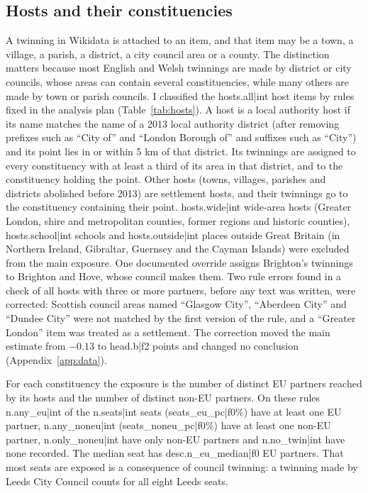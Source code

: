 \documentclass[11pt,a4paper]{article}
\begin{document}
\subsection{Hosts and their constituencies}
A twinning in Wikidata is attached to an item, and that item may be a town, a village, a parish, a district, a city council area or a county. The distinction matters because most English and Welsh twinnings are made by district or city councils, whose areas can contain several constituencies, while many others are made by town or parish councils. I classified the {{hosts.all|int}} host items by rules fixed in the analysis plan (Table~\ref{tab:hosts}). A host is a local authority host if its name matches the name of a 2013 local authority district (after removing prefixes such as ``City of'' and ``London Borough of'' and suffixes such as ``City'') and its point lies in or within 5 km of that district. Its twinnings are assigned to every constituency with at least a third of its area in that district, and to the constituency holding the point. Other hosts (towns, villages, parishes and districts abolished before 2013) are settlement hosts, and their twinnings go to the constituency containing their point. {{hosts.wide|int}} wide-area hosts (Greater London, shire and metropolitan counties, former regions and historic counties), {{hosts.school|int}} schools and {{hosts.outside|int}} places outside Great Britain (in Northern Ireland, Gibraltar, Guernsey and the Cayman Islands) were excluded from the main exposure. One documented override assigns Brighton's twinnings to Brighton and Hove, whose council makes them. Two rule errors found in a check of all hosts with three or more partners, before any text was written, were corrected: Scottish council areas named ``Glasgow City'', ``Aberdeen City'' and ``Dundee City'' were not matched by the first version of the rule, and a ``Greater London'' item was treated as a settlement. The correction moved the main estimate from $-0.13$ to {{head.b|f2}} points and changed no conclusion (Appendix~\ref{app:data}).

For each constituency the exposure is the number of distinct EU partners reached by its hosts and the number of distinct non-EU partners. On these rules {{n.any_eu|int}} of the {{n.seats|int}} seats ({{seats_eu_pc|f0}}\%) have at least one EU partner, {{n.any_noneu|int}} ({{seats_noneu_pc|f0}}\%) have at least one non-EU partner, {{n.only_noneu|int}} have only non-EU partners and {{n.no_twin|int}} have none recorded. The median seat has {{desc.n_eu_median|f0}} EU partners. That most seats are exposed is a consequence of council twinning: a twinning made by Leeds City Council counts for all eight Leeds seats.
\end{document}
